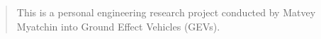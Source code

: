 

\begin{abstract}
    This is a personal engineering research project conducted by Matvey Myatchin into Ground Effect Vehicles (GEVs).
\end{abstract}
